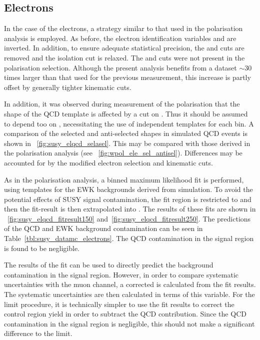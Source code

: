 \subsection{Electrons}
\label{sec:susy_electron_bgpredict}
In the case of the electrons, a strategy similar to that used in the \PW
polarisation analysis is employed. As before, the electron identification
variables \deltaetain and \deltaphiin are inverted. In addition, to ensure
adequate statistical precision, the  and \Dz cuts are removed and the
isolation cut is relaxed. The  and \Dz cuts were not present in the \PW
polarisation selection. Although the present analysis benefits from a dataset
$\sim 30$ times larger than that used for the previous measurement, this
increase is partly offset by generally tighter kinematic cuts.

In addition, it was observed during measurement of the \PW polarisation that the
shape of the QCD template is affected by a cut on \PtW. Thus it should be
assumed to depend too on \STlep, necessitating the use of independent templates
for each \STlep bin. A comparison of the selected and anti-selected shapes in
simulated \ac{QCD} events is shown in \fig~\ref{fig:susy_elqcd_selasel}. This
may be compared with those derived in the \PW polarisation analysis (see
\fig~\ref{fig:wpol_ele_sel_antisel}). Differences may be accounted for by the
modified electron selection and kinematic cuts.

As in the \PW polarisation analysis, a binned maximum likelihood fit is
performed, using templates for the \ac{EWK} backgrounds derived from
simulation. To avoid the potential effects of \ac{SUSY} signal contamination,
the fit region is restricted to \LPcontrol and then the fit-result is then
extrapolated into \LPsignal. The results of these fits are shown in
\figs~\ref{fig:susy_elqcd_fitresult150}
and~\ref{fig:susy_elqcd_fitresult250}. The predictions of the \ac{QCD} and
\ac{EWK} background contamination can be seen in
Table~\ref{tbl:susy_datamc_electrons}. The \ac{QCD} contamination in the signal
region is found to be negligible.

The results of the fit can be used to directly predict the background
contamination in the signal region. However, in order to compare systematic
uncertainties with the muon channel, a corrected \RCS is calculated from the fit
results. The systematic uncertainties are then calculated in terms of this
variable. For the limit procedure, it is technically simpler to use the fit
results to correct the control region yield in order to subtract the \ac{QCD}
contribution. Since the \ac{QCD} contamination in the signal region is
negligible, this should not make a significant difference to the limit.

